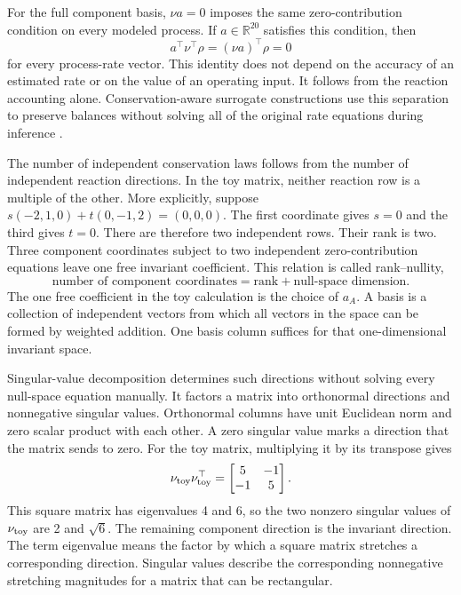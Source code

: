 For the full component basis, $\nu a=0$ imposes the same zero-contribution condition on every modeled process. If $a\in\mathbb{R}^{20}$ satisfies this condition, then
\begin{equation}
a^\top\nu^\top\rho=(\nu a)^\top\rho=0
\label{eq:individual_invariant}
\end{equation}
for every process-rate vector. This identity does not depend on the accuracy of an estimated rate or on the value of an operating input. It follows from the reaction accounting alone. Conservation-aware surrogate constructions use this separation to preserve balances without solving all of the original rate equations during inference \citep{SturmWexler2020,SturmWexler2022,Hansen2024}.

The number of independent conservation laws follows from the number of independent reaction directions. In the toy matrix, neither reaction row is a multiple of the other. More explicitly, suppose $s(-2,1,0)+t(0,-1,2)=(0,0,0)$. The first coordinate gives $s=0$ and the third gives $t=0$. There are therefore two independent rows. Their rank is two. Three component coordinates subject to two independent zero-contribution equations leave one free invariant coefficient. This relation is called rank--nullity,
\[
\text{number of component coordinates}
=\text{rank}+\text{null-space dimension}.
\]
The one free coefficient in the toy calculation is the choice of $a_A$. A basis is a collection of independent vectors from which all vectors in the space can be formed by weighted addition. One basis column suffices for that one-dimensional invariant space.

Singular-value decomposition determines such directions without solving every null-space equation manually. It factors a matrix into orthonormal directions and nonnegative singular values. Orthonormal columns have unit Euclidean norm and zero scalar product with each other. A zero singular value marks a direction that the matrix sends to zero. For the toy matrix, multiplying it by its transpose gives
\[
\nu_{\rm toy}\nu_{\rm toy}^\top
=\begin{bmatrix}5&-1\\-1&5\end{bmatrix}.
\]
This square matrix has eigenvalues 4 and 6, so the two nonzero singular values of $\nu_{\rm toy}$ are 2 and $\sqrt6$. The remaining component direction is the invariant direction. The term eigenvalue means the factor by which a square matrix stretches a corresponding direction. Singular values describe the corresponding nonnegative stretching magnitudes for a matrix that can be rectangular.


